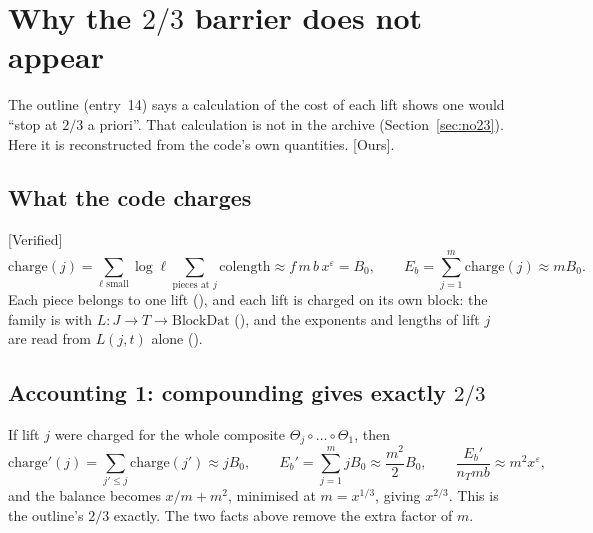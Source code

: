\documentclass[11pt]{article}
\newcommand{\Verified}{\textcolor{verc}{\textsf{\small[Verified]}}}
\newcommand{\Ours}{\textcolor{oursc}{\textsf{\small[Ours]}}}
\newcommand{\eps}{\varepsilon}
\theoremstyle{plain}
\theoremstyle{definition}
\begin{document}
\section{Why the $2/3$ barrier does not appear}\label{sec:23}

The outline (entry~14) says a calculation of the cost of each lift shows one would ``stop at $2/3$ a
priori''. That calculation is not in the archive (Section~\ref{sec:no23}). Here it is reconstructed
from the code's own quantities. \Ours.

\subsection{What the code charges}

\Verified{}
\[
\mathrm{charge}(j)=\sum_{\ell\text{ small}}\log\ell\sum_{\text{pieces at }j}\mathrm{colength}
\approx f\,m\,b\,x^\eps=B_0,\qquad E_b=\sum_{j=1}^m\mathrm{charge}(j)\approx m B_0.
\]
Each piece belongs to one lift (), and each lift is charged on its own block:
the family is  with $L:J\to T\to\mathrm{BlockDat}$ (), and the
exponents and lengths of lift $j$ are read from $L(j,t)$ alone ().

\subsection{Accounting 1: compounding gives exactly $2/3$}

If lift $j$ were charged for the whole composite $\Theta_j\circ\dots\circ\Theta_1$, then
\[
\mathrm{charge}'(j)=\sum_{j'\le j}\mathrm{charge}(j')\approx jB_0,\qquad
E_b'=\sum_{j=1}^m jB_0\approx\frac{m^2}{2}B_0,\qquad \frac{E_b'}{n_Tmb}\approx m^2x^\eps,
\]
and the balance becomes $x/m+m^2$, minimised at $m=x^{1/3}$, giving $x^{2/3}$. This is the outline's
$2/3$ exactly. The two facts above remove the extra factor of $m$.
\end{document}
